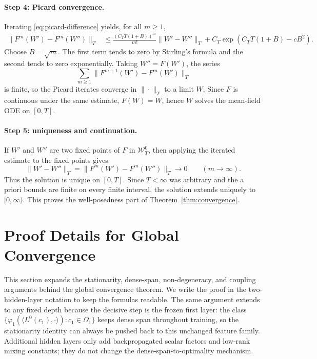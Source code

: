 \paragraph{Step 4: Picard convergence.}
Iterating \eqref{eq:picard-difference} yields, for all $m\ge1$,
\begin{align}
\|F^m(W')-F^m(W'')\|_T
&\le
\frac{(C_TT(1+B))^m}{m!}\|W'-W''\|_T
+
C_T\exp(C_TT(1+B)-cB^2).
\end{align}
Choose $B=\sqrt m$. The first term tends to zero by Stirling's formula and the second tends to zero exponentially. Taking $W''=F(W')$, the series
\begin{equation}
\sum_{m\ge1}\|F^{m+1}(W')-F^m(W')\|_T
\end{equation}
is finite, so the Picard iterates converge in $\|\cdot\|_T$ to a limit $W$. Since $F$ is continuous under the same estimate, $F(W)=W$, hence $W$ solves the mean-field ODE on $[0,T]$.

\paragraph{Step 5: uniqueness and continuation.}
If $W'$ and $W''$ are two fixed points of $F$ in $\mathcal W_T^0$, then applying the iterated estimate to the fixed points gives
\begin{equation}
\|W'-W''\|_T
=
\|F^m(W')-F^m(W'')\|_T
\to0
\qquad (m\to\infty).
\end{equation}
Thus the solution is unique on $[0,T]$. Since $T<\infty$ was arbitrary and the a priori bounds are finite on every finite interval, the solution extends uniquely to $[0,\infty)$. This proves the well-posedness part of Theorem~\ref{thm:convergence}.

\section{Proof Details for Global Convergence}
\label{app:global-proof}

This section expands the stationarity, dense-span, non-degeneracy, and coupling arguments behind the global convergence theorem. We write the proof in the two-hidden-layer notation to keep the formulas readable. The same argument extends to any fixed depth because the decisive step is the frozen first layer: the class $\{\varphi_1(\langle L^0(c_1),\cdot\rangle):c_1\in\Omega_1\}$ keeps dense span throughout training, so the stationarity identity can always be pushed back to this unchanged feature family. Additional hidden layers only add backpropagated scalar factors and low-rank mixing constants; they do not change the dense-span-to-optimality mechanism.


